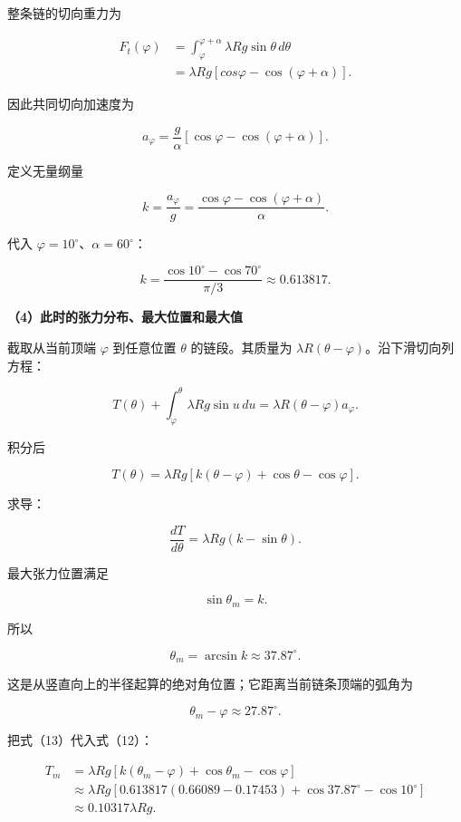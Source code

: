 \documentclass[12pt,a4paper,UTF8]{ctexart}
\begin{document}
整条链的切向重力为

\[
\begin{aligned}
F_t(\varphi)
&=\int_\varphi^{\varphi+\alpha}
\lambda Rg\sin\theta\,d\theta\\
&=\lambda Rg[cos\varphi-\cos(\varphi+\alpha)].
\end{aligned}
\]

因此共同切向加速度为

\[
a_\varphi
=\frac{g}{\alpha}
[\cos\varphi-\cos(\varphi+\alpha)].
\tag{9}
\]

定义无量纲量

\[
k=\frac{a_\varphi}{g}
=\frac{\cos\varphi-\cos(\varphi+\alpha)}{\alpha}.
\tag{10}
\]

代入 \(\varphi=10^\circ\)、\(\alpha=60^\circ\)：

\[
k
=\frac{\cos10^\circ-\cos70^\circ}{\pi/3}
\approx0.613817.
\tag{11}
\]

\textbf{（4）此时的张力分布、最大位置和最大值}

截取从当前顶端 \(\varphi\) 到任意位置 \(\theta\) 的链段。其质量为
\(\lambda R(\theta-\varphi)\)。沿下滑切向列方程：

\[
T(\theta)
+\int_\varphi^\theta\lambda Rg\sin u\,du
=\lambda R(\theta-\varphi)a_\varphi.
\]

积分后

\[
\boxed{
T(\theta)=\lambda Rg
\left[k(\theta-\varphi)+\cos\theta-\cos\varphi\right]
}.
\tag{12}
\]

求导：

\[
\frac{dT}{d\theta}=\lambda Rg(k-\sin\theta).
\]

最大张力位置满足

\[
\sin\theta_m=k.
\]

所以

\[
\boxed{
\theta_m=\arcsin k
\approx37.87^\circ
}.
\tag{13}
\]

这是从竖直向上的半径起算的绝对角位置；它距离当前链条顶端的弧角为

\[
\theta_m-\varphi\approx27.87^\circ.
\]

把式（13）代入式（12）：

\[
\begin{aligned}
T_m
&=\lambda Rg
\left[k(\theta_m-\varphi)+\cos\theta_m-\cos\varphi\right]\\
&\approx\lambda Rg
\left[0.613817(0.66089-0.17453)
+\cos37.87^\circ-\cos10^\circ\right]\\
&\approx0.10317\lambda Rg.
\end{aligned}
\]
\end{document}
